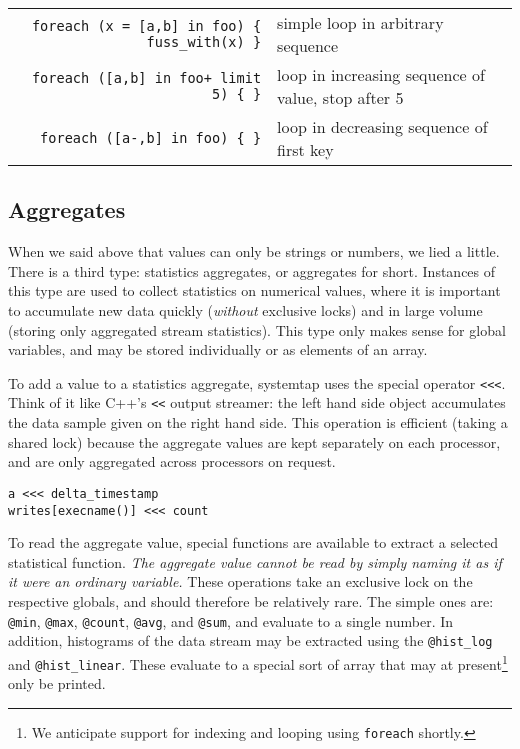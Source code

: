 \documentclass{article}
\renewcommand{\nomenclature}[2]{}
\begin{document}
\begin{tabular}{rp{}}
\verb|foreach (x = [a,b] in foo) { fuss_with(x) }| & simple loop in arbitrary sequence \\
\verb|foreach ([a,b] in foo+ limit 5) { }| & loop in increasing sequence of value, stop after 5 \\
\verb|foreach ([a-,b] in foo) { }| & loop in decreasing sequence of first key \\
\end{tabular}

\subsection{Aggregates}

When we said above that values can only be strings or numbers, we lied
a little.  There is a third type: statistics aggregates, or aggregates
for short.  Instances of this type are used to collect statistics on
numerical values, where it is important to accumulate new data quickly
({\em without} exclusive locks) and in large volume (storing only
aggregated stream statistics).  This type only makes sense for global
variables, and may be stored individually or as elements of an array.
\nomenclature{aggregate}{A special ``write-mostly'' data type used to
efficiently store aggregated statistical values of a potentially huge
data stream.}

To add a value to a statistics aggregate, systemtap uses the special
operator \verb+<<<+.  Think of it like C++'s \verb+<<+ output
streamer: the left hand side object accumulates the data sample given
on the right hand side.  This operation is efficient (taking a shared
lock) because the aggregate values are kept separately on each
processor, and are only aggregated across processors on request.

\begin{verbatim}
a <<< delta_timestamp
writes[execname()] <<< count
\end{verbatim}

To read the aggregate value, special functions are available to
extract a selected statistical function. {\em The aggregate value
cannot be read by simply naming it as if it were an ordinary
variable.}  These operations take an exclusive lock on the respective
globals, and should therefore be relatively rare.  The simple ones
are: \verb+@min+, \verb+@max+, \verb+@count+, \verb+@avg+, and
\verb+@sum+, and evaluate to a single number.  In addition, histograms
of the data stream may be extracted using the \verb+@hist_log+ and
\verb+@hist_linear+.  These evaluate to a special sort of array that
may at present\footnote{We anticipate support for indexing and looping
using {\tt foreach} shortly.} only be printed.
\nomenclature{extractor}{A function-like expression in a script that
computes a single statistic for a given aggregate.}
\end{document}
